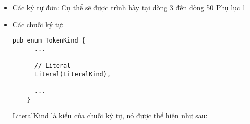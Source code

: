 \begin{itemize}
  \item Các ký tự đơn: Cụ thể sẽ được trình bày tại dòng 3 đến dòng 50 \hyperref[appendix:1]{Phụ lục 1}

  \item Các chuỗi ký tự:
  \begin{lstlisting}[]
    pub enum TokenKind {
      ...
  
      // Literal
      Literal(LiteralKind),
  
      ...
    }
  \end{lstlisting}

    LiteralKind là kiểu của chuỗi ký tự, nó được thể hiện như sau:


\end{itemize}
